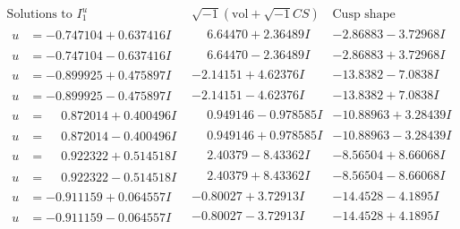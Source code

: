 \documentclass[1p]{elsarticle_modified}
\theoremstyle{definition}
\newcommand{\I}{\sqrt{-1}}
\begin{document}
$$\begin{array}{c|c|c}  
\text{Solutions to }I^u_{1}& \I (\text{vol} + \sqrt{-1}CS) & \text{Cusp shape}\\
 \hline 
\begin{aligned}
u &= -0.747104 + 0.637416 I\end{aligned}
 & \phantom{-}6.64470 + 2.36489 I & -2.86883 - 3.72968 I \\ \hline\begin{aligned}
u &= -0.747104 - 0.637416 I\end{aligned}
 & \phantom{-}6.64470 - 2.36489 I & -2.86883 + 3.72968 I \\ \hline\begin{aligned}
u &= -0.899925 + 0.475897 I\end{aligned}
 & -2.14151 + 4.62376 I & -13.8382 - 7.0838 I \\ \hline\begin{aligned}
u &= -0.899925 - 0.475897 I\end{aligned}
 & -2.14151 - 4.62376 I & -13.8382 + 7.0838 I \\ \hline\begin{aligned}
u &= \phantom{-}0.872014 + 0.400496 I\end{aligned}
 & \phantom{-}0.949146 - 0.978585 I & -10.88963 + 3.28439 I \\ \hline\begin{aligned}
u &= \phantom{-}0.872014 - 0.400496 I\end{aligned}
 & \phantom{-}0.949146 + 0.978585 I & -10.88963 - 3.28439 I \\ \hline\begin{aligned}
u &= \phantom{-}0.922322 + 0.514518 I\end{aligned}
 & \phantom{-}2.40379 - 8.43362 I & -8.56504 + 8.66068 I \\ \hline\begin{aligned}
u &= \phantom{-}0.922322 - 0.514518 I\end{aligned}
 & \phantom{-}2.40379 + 8.43362 I & -8.56504 - 8.66068 I \\ \hline\begin{aligned}
u &= -0.911159 + 0.064557 I\end{aligned}
 & -0.80027 + 3.72913 I & -14.4528 - 4.1895 I \\ \hline\begin{aligned}
u &= -0.911159 - 0.064557 I\end{aligned}
 & -0.80027 - 3.72913 I & -14.4528 + 4.1895 I \\ \hline\begin{aligned}

\end{aligned}
\end{array}$$
\end{document}
